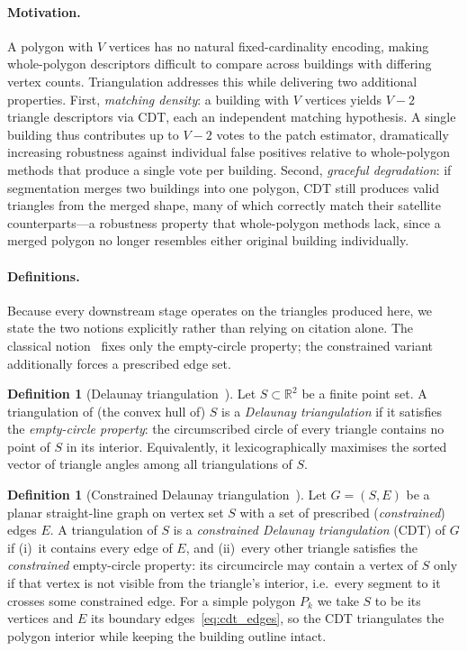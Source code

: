 \documentclass[10pt]{article}
\theoremstyle{plain}
\theoremstyle{definition}
\newtheorem{definition}[theorem]{Definition}
\begin{document}
\paragraph{Motivation.}
A polygon with $V$ vertices has no natural fixed-cardinality encoding, making
whole-polygon descriptors difficult to compare across buildings with differing
vertex counts.
Triangulation addresses this while delivering two additional properties.
First, \emph{matching density}: a building with $V$ vertices yields $V-2$
triangle descriptors via CDT, each an independent matching hypothesis.
A single building thus contributes up to $V-2$ votes to the patch estimator,
dramatically increasing robustness against individual false positives relative
to whole-polygon methods that produce a single vote per building.
Second, \emph{graceful degradation}: if segmentation merges two buildings into
one polygon, CDT still produces valid triangles from the merged shape, many of
which correctly match their satellite counterparts---a robustness property
that whole-polygon methods lack, since a merged polygon no longer resembles
either original building individually.

\paragraph{Definitions.}
Because every downstream stage operates on the triangles produced here, we
state the two notions explicitly rather than relying on citation alone. The
classical notion~\cite{delaunay1934} fixes only the empty-circle property; the
constrained variant~\cite{chew1989cdt} additionally forces a prescribed edge set.

\begin{definition}[Delaunay triangulation~\cite{delaunay1934}]
\label{def:dt}
Let $S\subset\mathbb{R}^2$ be a finite point set. A triangulation of (the convex
hull of) $S$ is a \emph{Delaunay triangulation} if it satisfies the
\emph{empty-circle property}: the circumscribed circle of every triangle
contains no point of $S$ in its interior. Equivalently, it lexicographically
maximises the sorted vector of triangle angles among all triangulations of $S$.
\end{definition}

\begin{definition}[Constrained Delaunay triangulation~\cite{chew1989cdt}]
\label{def:cdt}
Let $G=(S,E)$ be a planar straight-line graph on vertex set $S$ with a set of
prescribed (\emph{constrained}) edges $E$. A triangulation of $S$ is a
\emph{constrained Delaunay triangulation} (CDT) of $G$ if (i)~it contains every
edge of $E$, and (ii)~every other triangle satisfies the \emph{constrained}
empty-circle property: its circumcircle may contain a vertex of $S$ only if that
vertex is not visible from the triangle's interior, i.e.\ every segment to it
crosses some constrained edge. For a simple polygon $P_k$ we take $S$ to be its
vertices and $E$ its boundary edges~\eqref{eq:cdt_edges}, so the CDT triangulates
the polygon interior while keeping the building outline intact.
\end{definition}
\end{document}
